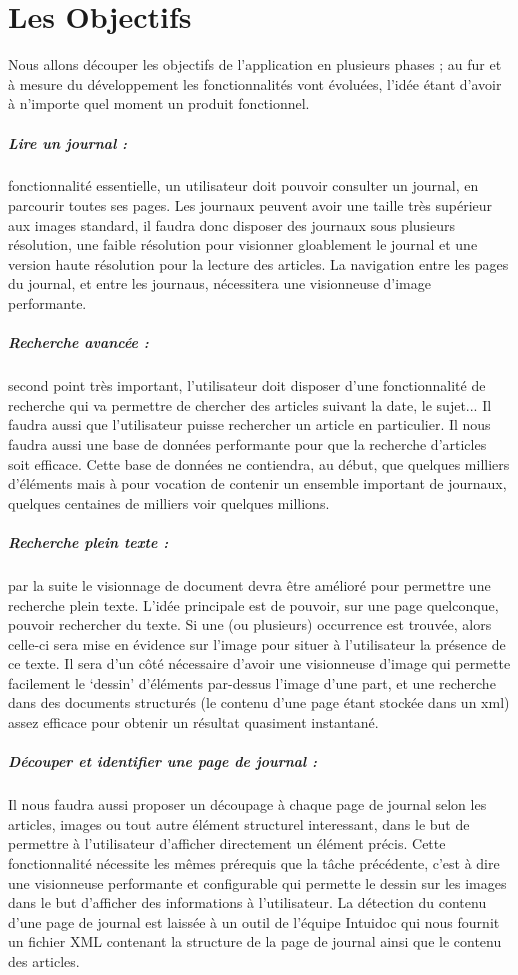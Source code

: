 \section{Les Objectifs}
    \label{sec:objectifs}

    Nous allons découper les objectifs de l’application en plusieurs phases ; au fur et à mesure
    du développement les fonctionnalités vont évoluées, l’idée étant d’avoir à n’importe quel moment un produit fonctionnel.

    \subparagraph{Lire un journal :}
    fonctionnalité essentielle, un utilisateur doit pouvoir consulter un journal, en parcourir
    toutes ses pages. Les journaux peuvent avoir une taille très supérieur aux images standard,
    il faudra donc disposer des journaux sous plusieurs résolution, une faible résolution pour visionner gloablement
    le journal et une version haute résolution pour la lecture des articles.
    La navigation entre les pages du journal, et entre les journaus, nécessitera une visionneuse d’image performante.

    \subparagraph{Recherche avancée :}
    second point très important, l’utilisateur doit disposer d’une fonctionnalité de recherche
    qui va permettre de chercher des articles suivant la date, le sujet... Il faudra aussi que l’utilisateur
    puisse rechercher un article en particulier. Il nous faudra aussi une base de données performante
    pour que la recherche d’articles soit efficace. Cette base de données ne contiendra, au début,
    que quelques milliers d’éléments mais à pour vocation de contenir un ensemble important de journaux,
    quelques centaines de milliers voir quelques millions.

    \subparagraph{Recherche plein texte :}
    par la suite le visionnage de document devra être amélioré pour permettre une recherche plein texte.
    L’idée principale est de pouvoir, sur une page quelconque, pouvoir rechercher du texte. Si une (ou plusieurs)
    occurrence est trouvée, alors celle-ci sera mise en évidence sur l’image pour situer à l’utilisateur
    la présence de ce texte. Il sera d’un côté nécessaire d’avoir une visionneuse d’image qui permette facilement
    le ‘dessin’ d’éléments par-dessus l’image d’une part, et une recherche dans des documents structurés
    (le contenu d’une page étant stockée dans un xml) assez efficace pour obtenir un résultat quasiment instantané.

    \subparagraph{Découper et identifier une page de journal :}
    Il nous faudra aussi proposer un découpage à chaque page de journal selon les articles, images ou
    tout autre élément structurel interessant, dans le but de permettre à l’utilisateur d’afficher directement
    un élément précis. Cette fonctionnalité nécessite les mêmes prérequis que la tâche précédente,
    c’est à dire une visionneuse performante et configurable qui permette le dessin sur les images dans
    le but d’afficher des informations à l’utilisateur. La détection du contenu d’une page de journal est
    laissée à un outil de l’équipe Intuidoc qui nous fournit un fichier XML contenant la structure de
    la page de journal ainsi que le contenu des articles.

